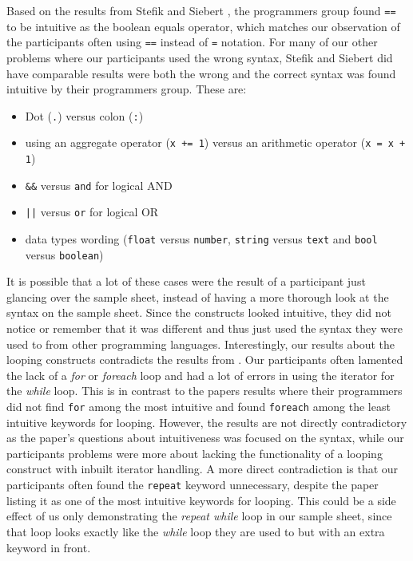 \documentclass[preprint,10pt]{sigplanconf}
\begin{document}
Based on the results from Stefik and Siebert \cite{Empiricalinvestigation}, the programmers group found \lstinline!==! to be intuitive as the boolean equals operator, which matches our observation of the participants often using \lstinline!==! instead of \lstinline!=! notation. For many of our other problems where our participants used the wrong syntax, Stefik and Siebert\cite{Empiricalinvestigation} did have comparable results were both the wrong and the correct syntax was found intuitive by their programmers group. These are: 
\begin{itemize}
\item Dot (\lstinline!.!) versus colon (\lstinline!:!)
\item using an aggregate operator (\lstinline!x += 1!) versus an arithmetic operator (\lstinline!x = x + 1!)
\item \lstinline!&&! versus \lstinline!and! for logical AND
\item \lstinline!||! versus \lstinline!or! for logical OR
\item data types wording (\lstinline!float! versus \lstinline!number!, \lstinline!string! versus \lstinline!text! and \lstinline!bool! versus \lstinline!boolean!)
\end{itemize}

It is possible that a lot of these cases were the result of a participant just glancing over the sample sheet, instead of having a more thorough look at the syntax on the sample sheet. Since the constructs looked intuitive, they did not notice or remember that it was different and thus just used the syntax they were used to from other programming languages. Interestingly, our results about the looping constructs contradicts the results from \cite{Empiricalinvestigation}. Our participants often lamented the lack of a \textit{for} or \textit{foreach} loop and had a lot of errors in using the iterator for the \textit{while} loop. This is in contrast to the papers results where their programmers did not find \lstinline!for! among the most intuitive and found \lstinline!foreach! among the least intuitive keywords for looping. However, the results are not directly contradictory as the paper's questions about intuitiveness was focused on the syntax, while our participants problems were more about lacking the functionality of a looping construct with inbuilt iterator handling. A more direct contradiction is that our participants often found the \lstinline!repeat! keyword unnecessary, despite the paper listing it as one of the most intuitive keywords for looping. This could be a side effect of us only demonstrating the \textit{repeat while} loop in our sample sheet, since that loop looks exactly like the \textit{while} loop they are used to but with an extra keyword in front. 
\end{document}
